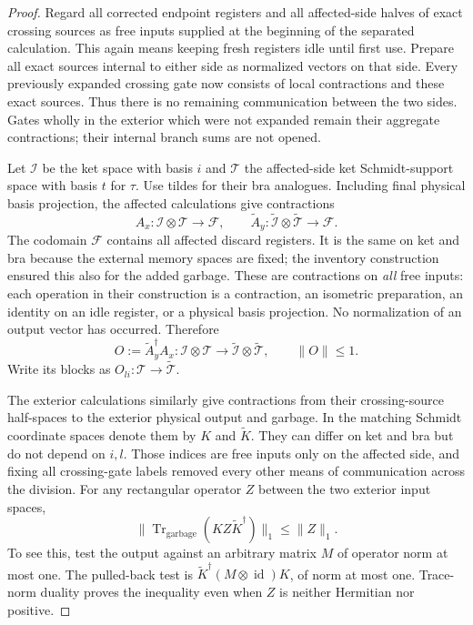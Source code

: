 \documentclass[11pt]{article}
\numberwithin{equation}{section}
\theoremstyle{definition}
\theoremstyle{remark}
\begin{document}
\begin{proof}
Regard all corrected endpoint registers and all affected-side halves of
exact crossing sources as free inputs supplied at the beginning of the
separated calculation.  This again means keeping fresh registers idle
until first use.  Prepare all exact sources internal to either side as
normalized vectors on that side.  Every previously expanded crossing
gate now consists of local contractions and these exact sources.  Thus
there is no remaining communication between the two sides.  Gates
wholly in the exterior which were not expanded remain their aggregate
contractions; their internal branch sums are not opened.

Let $\mathcal I$ be the ket space with basis $i$ and $\mathcal T$ the
affected-side ket Schmidt-support space with basis $t$ for $\tau$.
Use tildes for their bra analogues.  Including final physical basis
projection, the affected calculations give contractions
\[
 A_x:\mathcal I\otimes\mathcal T\longrightarrow\mathcal F,
 \qquad
 \widetilde A_y:\widetilde{\mathcal I}\otimes
              \widetilde{\mathcal T}\longrightarrow\mathcal F.
\]
The codomain $\mathcal F$ contains all affected discard registers.  It
is the same on ket and bra because the external memory spaces are fixed;
the inventory construction ensured this also for the added garbage.
These are contractions on \emph{all} free inputs: each operation in
their construction is a contraction, an isometric preparation, an
identity on an idle register, or a physical basis projection.  No
normalization of an output vector has occurred.  Therefore
\begin{equation}
 O:=\widetilde A_y^\dagger A_x:
       \mathcal I\otimes\mathcal T\longrightarrow
       \widetilde{\mathcal I}\otimes\widetilde{\mathcal T},
 \qquad \lVert O\rVert\le1.
 \label{eq:compression-block-contraction}
\end{equation}
Write its blocks as $O_{li}:\mathcal T\to\widetilde{\mathcal T}$.

The exterior calculations similarly give contractions from their
crossing-source half-spaces to the exterior physical output and
garbage.  In the matching Schmidt coordinate spaces denote them by
$K$ and $\widetilde K$.  They can differ on ket and bra but do not
depend on $i,l$.  Those indices are free inputs only on the affected
side, and fixing all crossing-gate labels removed every other means
of communication across the division.  For any rectangular operator
$Z$ between the two exterior input spaces,
\begin{equation}
 \lVert \operatorname{Tr}_{\mathrm{garbage}}(KZ\widetilde K^\dagger)\rVert_1
          \le\lVert Z\rVert_1.
 \label{eq:compression-exterior-contraction}
\end{equation}
To see this, test the output against an arbitrary matrix $M$ of operator
norm at most one.  The pulled-back test is
$\widetilde K^\dagger(M\otimes\operatorname{id})K$, of norm at most one.
Trace-norm duality proves the inequality even when $Z$ is neither
Hermitian nor positive.


\end{proof}
\end{document}

